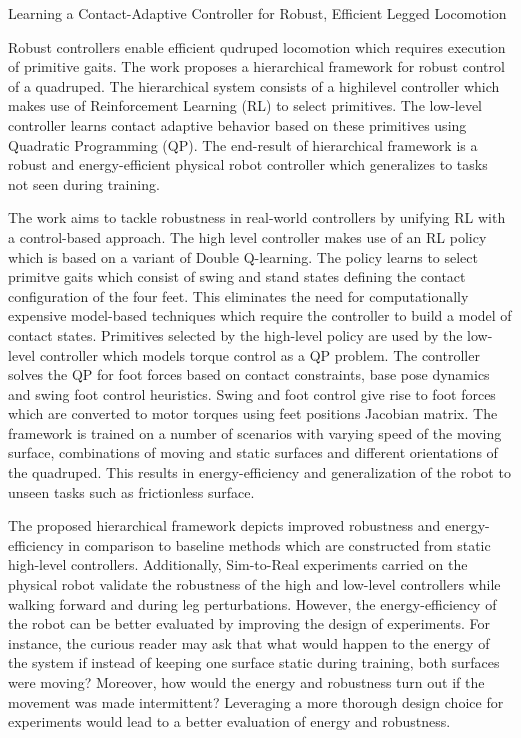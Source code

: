\documentclass[11pt,letterpaper]{article}
\begin{document}
\begin{center}
  \large{Learning a Contact-Adaptive Controller for Robust,
  Efficient Legged Locomotion}
\end{center}

Robust controllers enable efficient qudruped locomotion which requires execution of primitive gaits. The work proposes a hierarchical framework for robust control of a quadruped. The hierarchical system consists of a highilevel controller which makes use of Reinforcement Learning (RL) to select primitives. The low-level controller learns contact adaptive behavior based on these primitives using Quadratic Programming (QP). The end-result of hierarchical framework is a robust and energy-efficient physical robot controller which generalizes to tasks not seen during training.  

The work aims to tackle robustness in real-world controllers by unifying RL with a control-based approach. The high level controller makes use of an RL policy which is based on a variant of Double Q-learning. The policy learns to select primitve gaits which consist of swing and stand states defining the contact configuration of the four feet. This eliminates the need for computationally expensive model-based techniques which require the controller to build a model of contact states. Primitives selected by the high-level policy are used by the low-level controller which models torque control as a QP problem. The controller solves the QP for foot forces based on contact constraints, base pose dynamics and swing foot control heuristics. Swing and foot control give rise to foot forces which are converted to motor torques using feet positions Jacobian matrix. The framework is trained on a number of scenarios with varying speed of the moving surface, combinations of moving and static surfaces and different orientations of the quadruped. This results in energy-efficiency and generalization of the robot to unseen tasks such as frictionless surface.

The proposed hierarchical framework depicts improved robustness and energy-efficiency in comparison to baseline methods which are constructed from static high-level controllers. Additionally, Sim-to-Real experiments carried on the physical robot validate the robustness of the high and low-level controllers while walking forward and during leg perturbations. However, the energy-efficiency of the robot can be better evaluated by improving the design of experiments. For instance, the curious reader may ask that what would happen to the energy of the system if instead of keeping one surface static during training, both surfaces were moving? Moreover, how would the energy and robustness turn out if the movement was made intermittent? Leveraging a more thorough design choice for experiments would lead to a better evaluation of energy and robustness. 
\end{document}
